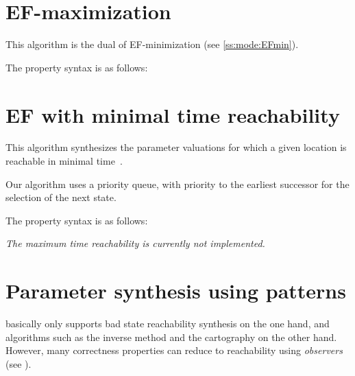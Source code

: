 \section{EF-maximization}\label{ss:mode:EFmax}

This algorithm is the dual of EF-minimization (see \cref{ss:mode:EFmin}).

The property syntax is as follows:



\section{EF with minimal time reachability}\label{ss:mode:EFopt}

This algorithm synthesizes the parameter valuations for which a given location is reachable in minimal time~\cite{ABPV19}.

Our algorithm uses a priority queue, with priority to the earliest successor for the selection of the next state.

%

The property syntax is as follows:


\emph{The maximum time reachability is currently not implemented.}


\section{Parameter synthesis using patterns}\label{ss:mode:prop}

\imitator{} basically only supports bad state reachability synthesis on the one hand, and algorithms such as the inverse method and the cartography on the other hand.
However, many correctness properties can reduce to reachability using \emph{observers} (see \cite{ABL98,ABBL98,ABBL03,Andre13ICECCS}).

